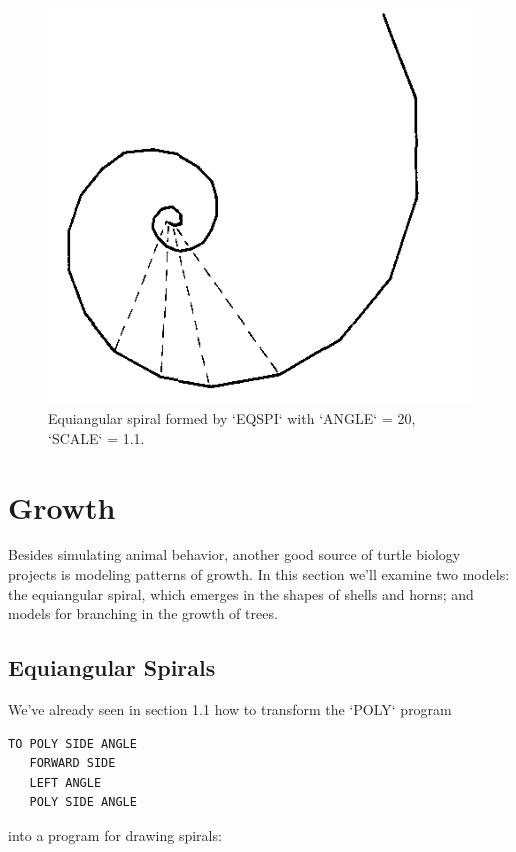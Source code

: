 \documentclass{book}
\begin{document}
\begin{figure}
\begin{center}
\includegraphics[scale=1]{fig2-15}
\caption{Equiangular spiral formed by \textsc{`EQSPI`} with \textsc{`ANGLE`} = 20, \textsc{`SCALE`} = 1.1.}
\end{center}
\end{figure}

\section{Growth}

Besides simulating animal behavior, another good source of turtle biology projects is modeling patterns of growth. In this section we'll examine
two models: the equiangular spiral, which emerges in the shapes of shells
and horns; and models for branching in the growth of trees.

\subsection{Equiangular Spirals}

We've already seen in section 1.1 how to transform the \textsc{`POLY`} program

\begin{verbatim}
TO POLY SIDE ANGLE
   FORWARD SIDE
   LEFT ANGLE
   POLY SIDE ANGLE
\end{verbatim}
\noindent into a program for drawing spirals:
\end{document}
